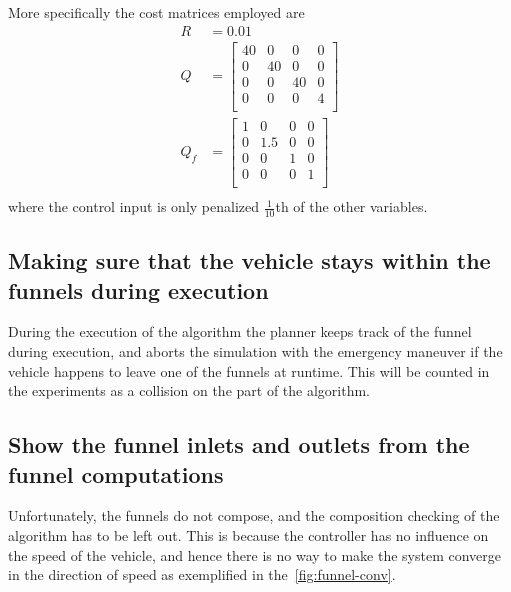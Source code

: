 More specifically the cost matrices employed are
\begin{align*}
  R &= 0.01 \\
  Q &= \begin{bmatrix}
    40 & 0 & 0 & 0 \\
    0 & 40 & 0 & 0 \\
    0 & 0 & 40 & 0 \\
    0 & 0 & 0 & 4 \\
  \end{bmatrix}
  \\
  Q_{f} &=
          \begin{bmatrix}
            1 & 0 & 0 & 0 \\
            0 & 1.5 & 0 & 0 \\
            0 & 0 & 1 & 0 \\
            0 & 0 & 0 & 1 \\
          \end{bmatrix}
  \\
\end{align*}
where the control input is only penalized \(\frac{1}{10}\)th of the other
variables.

\subsection{Making sure that the vehicle stays within the funnels during
  execution}
\label{subsec:check-vehicle-in-funnel}

During the execution of the \rrtfunnel{} algorithm the planner keeps track of
the funnel during execution, and aborts the simulation with the emergency
maneuver if the vehicle happens to leave one of the funnels at runtime. This
will be counted in the experiments as a collision on the part of the
\rrtfunnel{} algorithm.

\subsection{Show the funnel inlets and outlets from the funnel computations}
\label{subsec:funnel-no-composable}

Unfortunately, the funnels do not compose, and the composition checking of the
algorithm has to be left out. This is because the controller has no influence on
the speed of the vehicle, and hence there is no way to make the system converge
in the direction of speed as exemplified in the~\cref{fig:funnel-conv}.

